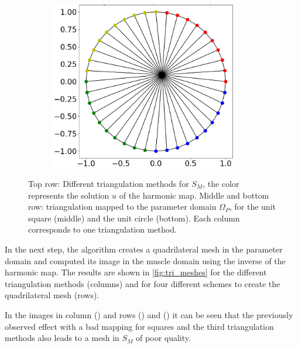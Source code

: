\begin{figure}
\begin{subfigure}[t]{0.31\textwidth}
    \label{fig:w_10}%
  \end{subfigure}
  \quad
  \begin{subfigure}[t]{0.31\textwidth}%
    \centering%
    \includegraphics[width=0.9\textwidth, trim=37mm 14mm 6mm 6mm, clip, angle=225,origin=c]{images/fiber_creation/mesh_plots/out_2_0_0_tri.png}%
    \label{fig:w_20}%
  \end{subfigure}
  
  \caption{Top row: Different triangulation methods for $S_M$, the color represents the solution $u$ of the harmonic map. Middle and bottom row: triangulation mapped to the parameter domain $\Omega_P$, for the unit square (middle) and the unit circle (bottom). Each column corresponds to one triangulation method.}%
  \label{fig:tri_triangulations}%
\end{figure}%



In the next step, the algorithm creates a quadrilateral mesh in the parameter domain and computed its image in the muscle domain using the inverse of the harmonic map. The results are shown in \cref{fig:tri_meshes} for the different triangulation methods (columns) and for four different schemes to create the quadrilateral mesh (rows).

In the images in column () and rows () and () it can be seen that the previously observed effect with a bad mapping for squares and the third triangulation methods also leads to a mesh in $S_M$ of poor quality.

